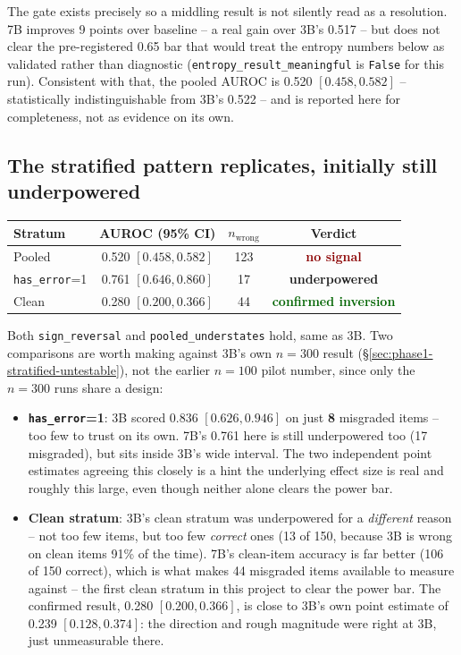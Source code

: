 \documentclass[11pt]{article}
\newcommand{\worked}[1]{\textcolor{darkgreen}{\textbf{#1}}}
\newcommand{\failed}[1]{\textcolor{darkred}{\textbf{#1}}}
\newcommand{\unresolved}[1]{\textcolor{darkamber}{\textbf{#1}}}
\begin{document}
The gate exists precisely so a middling result is not silently read as a
resolution. 7B improves 9 points over baseline -- a real gain over 3B's
0.517 -- but does not clear the pre-registered 0.65 bar that would treat the
entropy numbers below as validated rather than diagnostic
(\texttt{entropy\_result\_meaningful} is \texttt{False} for this run).
Consistent with that, the pooled AUROC is 0.520 $[0.458, 0.582]$ --
statistically indistinguishable from 3B's 0.522 -- and is reported here for
completeness, not as evidence on its own.

\subsection{The stratified pattern replicates, initially still underpowered}
\label{sec:phase4-stratified}

\begin{center}
\begin{tabular}{lccc}
\toprule
Stratum & AUROC (95\% CI) & $n_{\text{wrong}}$ & Verdict \\
\midrule
Pooled & 0.520 $[0.458, 0.582]$ & 123 & \failed{no signal} \\
\texttt{has\_error}=1 & 0.761 $[0.646, 0.860]$ & 17 & \unresolved{underpowered} \\
Clean & 0.280 $[0.200, 0.366]$ & 44 & \worked{confirmed inversion} \\
\bottomrule
\end{tabular}
\end{center}

Both \texttt{sign\_reversal} and \texttt{pooled\_understates} hold, same as
3B. Two comparisons are worth making against 3B's own $n=300$ result
(\S\ref{sec:phase1-stratified-untestable}), not the earlier $n=100$ pilot
number, since only the $n=300$ runs share a design:

\begin{itemize}
  \item \textbf{\texttt{has\_error}=1}: 3B scored 0.836 $[0.626, 0.946]$ on
    just \textbf{8} misgraded items -- too few to trust on its own. 7B's
    0.761 here is still underpowered too (17 misgraded), but sits inside
    3B's wide interval. The two independent point estimates agreeing this
    closely is a hint the underlying effect size is real and roughly this
    large, even though neither alone clears the power bar.
  \item \textbf{Clean stratum}: 3B's clean stratum was underpowered for a
    \emph{different} reason -- not too few items, but too few \emph{correct}
    ones (13 of 150, because 3B is wrong on clean items 91\% of the time).
    7B's clean-item accuracy is far better (106 of 150 correct), which is
    what makes 44 misgraded items available to measure against -- the first
    clean stratum in this project to clear the power bar. The confirmed
    result, 0.280 $[0.200, 0.366]$, is close to 3B's own point estimate of
    0.239 $[0.128, 0.374]$: the direction and rough magnitude were right at
    3B, just unmeasurable there.
\end{itemize}
\end{document}
